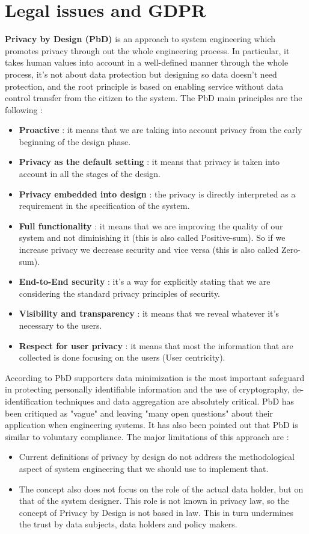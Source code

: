 \section{Legal issues and GDPR}
\textbf{Privacy by Design (PbD)} is an approach to system engineering which promotes privacy through out the whole engineering process. In particular, it takes human values into account in a well-defined manner through the whole process, it's not about data protection but designing so data doesn't need protection, and the root principle is based on enabling service without data control transfer from the citizen to the system. The PbD main principles are the following :
\begin{itemize}
\item \textbf{Proactive} : it means that we are taking into account privacy from the early beginning of the design phase.
\item \textbf{Privacy as the default setting} : it means that privacy is taken into account in all the stages of the design.
\item \textbf{Privacy embedded into design} : the privacy is directly interpreted as a requirement in the specification of the system.
\item \textbf{Full functionality} : it means that we are improving the quality of our system and not diminishing it (this is also called Positive-sum). So if we increase privacy we decrease security and vice versa (this is also called Zero-sum).
\item \textbf{End-to-End security} : it's a way for explicitly stating that we are considering the standard privacy principles of security.
\item \textbf{Visibility and transparency} : it means that we reveal whatever it's necessary to the users.
\item \textbf{Respect for user privacy} : it means that most the information that are collected is done focusing on the users (User centricity).
\end{itemize}
According to PbD supporters data minimization is the most important safeguard in protecting personally identifiable information and the use of cryptography, de-identification techniques and data aggregation are absolutely critical. PbD has been critiqued as "vague" and leaving "many open questions" about their application when engineering systems. It has also been pointed out that PbD is similar to voluntary compliance. The major limitations of this approach are :
\begin{itemize}
\item Current definitions of privacy by design do not address the methodological aspect of system engineering that we should use to implement that.
\item The concept also does not focus on the role of the actual data holder, but on that of the system designer. This role is not known in privacy law, so the concept of Privacy by Design is not based in law. This in turn undermines the trust by data subjects, data holders and policy makers.
\end{itemize}
